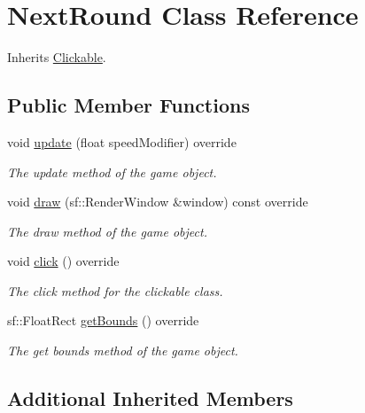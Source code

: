 \hypertarget{class_next_round}{\section{Next\+Round Class Reference}
\label{class_next_round}
}


Inherits \hyperlink{class_clickable}{Clickable}.

\subsection*{Public Member Functions}
\begin{DoxyCompactItemize}
\item 
void \hyperlink{class_next_round_ab6c2cb6a601f19c9898f962973c765c2}{update} (float speed\+Modifier) override
\begin{DoxyCompactList}\small\item\em The update method of the game object. \end{DoxyCompactList}\item 
void \hyperlink{class_next_round_a53759483573d0d90ff07900643b01889}{draw} (sf\+::\+Render\+Window \&window) const override
\begin{DoxyCompactList}\small\item\em The draw method of the game object. \end{DoxyCompactList}\item 
void \hyperlink{class_next_round_a4a8032a6c21bdf374edd7cd4551ce970}{click} () override
\begin{DoxyCompactList}\small\item\em The click method for the clickable class. \end{DoxyCompactList}\item 
sf\+::\+Float\+Rect \hyperlink{class_next_round_adddbc077e18c8b2911e85843aaa4d611}{get\+Bounds} () override
\begin{DoxyCompactList}\small\item\em The get bounds method of the game object. \end{DoxyCompactList}\end{DoxyCompactItemize}
\subsection*{Additional Inherited Members}


